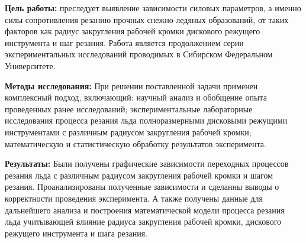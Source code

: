 \textbf{Цель работы:} преследует выявление зависимости силовых параметров, а именно силы сопротивления резанию прочных снежно-ледяных образований, от таких факторов как радиус закругления рабочей кромки дискового режущего инструмента и шаг резания. Работа является продолжением серии экспериментальных исследований проводимых в Сибирском Федеральном Университете.

\textbf{Методы исследования:} При решении поставленной задачи применен комплексный подход, включающий: научный анализ и обобщение опыта проведенных ранее исследований; экспериментальные лабораторные исследования процесса резания льда полноразмерными дисковыми режущими инструментами с различным радиусом закругления рабочей кромки; математическую и статистическую обработку результатов эксперимента.

\textbf{Результаты:} Были получены графические зависимости переходных процессов резания льда с различным радиусом закругления рабочей кромки и шагом резания. Проанализированы полученные зависимости и сделанны выводы о корректности проведения эксперимента. А также получены данные для дальнейшего анализа и построения математической модели процесса резания льда учитывающей влияние радиуса закругления рабочей кромки, дискового режущего инструмента и шага резания.